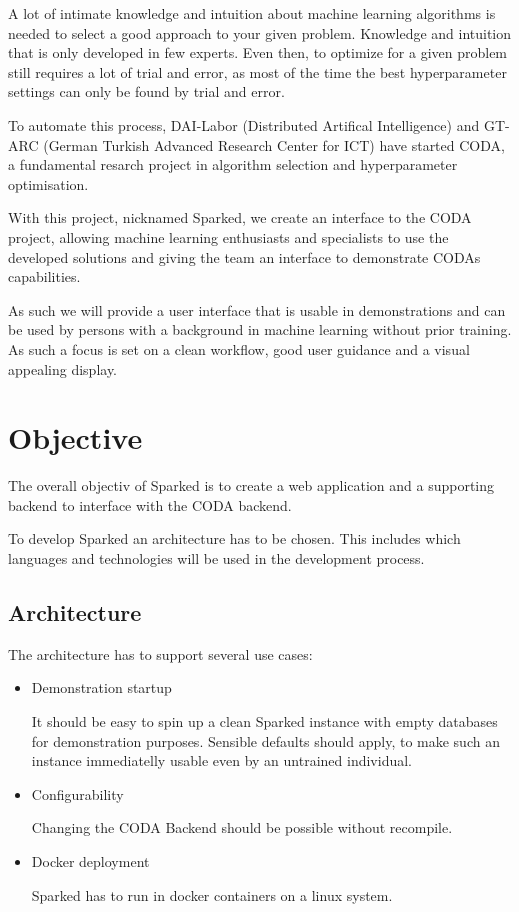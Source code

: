 \documentclass[12pt,a4paper,titlepage,oneside,BCOR1cm]{scrreprt}
\begin{document}
A lot of intimate knowledge and intuition about machine learning algorithms is needed to select a good approach to your given problem. Knowledge and intuition that is only developed in few experts. Even then, to optimize for a given problem still requires a lot of trial and error, as most of the time the best hyperparameter settings can only be found by trial and error.

To automate this process, DAI-Labor (Distributed Artifical Intelligence) and GT-ARC (German Turkish Advanced Research Center for ICT) have started CODA, a fundamental resarch project in algorithm selection and hyperparameter optimisation. \cite{CODA-Steckbrief}

With this project, nicknamed Sparked, we create an interface to the CODA project, allowing machine learning enthusiasts and specialists to use the developed solutions and giving the team an interface to demonstrate CODAs capabilities.

As such we will provide a user interface that is usable in demonstrations and can be used by persons with a background in machine learning without prior training. As such a focus is set on a clean workflow, good user guidance and a visual appealing display.






\chapter{Objective}
The overall objectiv of Sparked is to create a web application and a supporting backend to interface with the CODA backend. 

To develop Sparked an architecture has to be chosen. This includes which languages and technologies will be used in the development process. 

\section{Architecture}

The architecture has to support several use cases:
\begin{itemize}
  \item Demonstration startup
  
  It should be easy to spin up a clean Sparked instance with empty databases for demonstration purposes. Sensible defaults should apply, to make such an instance immediatelly usable even by an untrained individual.

  \item Configurability

  Changing the CODA Backend should be possible without recompile.

  \item Docker deployment

  Sparked has to run in docker containers on a linux system.

\end{itemize}
\end{document}
